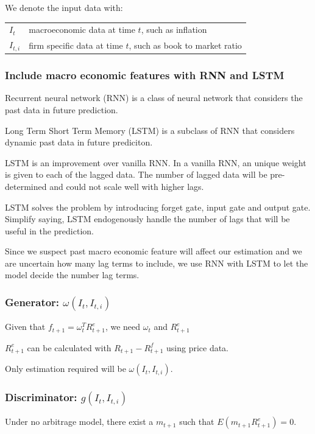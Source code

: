 \documentclass[11pt, oneside]{article}   	%
\begin{document}
We denote the input data with:

\begin{tabular}{l @{ := } l}
    $I_t$ & macroeconomic data at time $t$, such as inflation\\
    $I_{t, i}$ & firm specific data at time $t$, such as book to market ratio
\end{tabular}

\subsubsection{Include macro economic features with RNN and LSTM}

Recurrent neural network (RNN) is a class of neural network that considers the past data in future prediction.

Long Term Short Term Memory (LSTM) is a subclass of RNN that considers dynamic past data in future prediciton.

LSTM is an improvement over vanilla RNN.
In a vanilla RNN, an unique weight is given to each of the lagged data. 
The number of lagged data will be pre-determined and could not scale well with higher lags.

LSTM solves the problem by introducing forget gate, input gate and output gate.
Simplify saying, LSTM endogenously handle the number of lags that will be useful in the prediction.

Since we suspect past macro economic feature will affect our estimation and we are uncertain how many lag terms
to include, we use RNN with LSTM to let the model decide the number lag terms.

\subsubsection{Generator: $\omega(I_t, I_{t, i})$}

Given that $f_{t+1}=\omega_t^T R^e_{t+1}$, we need $\omega_t$ and $R^e_{t+1}$

$R^e_{t+1}$ can be calculated with $R_{t+1} - R^f_{t+1}$ using price data.

Only estimation required will be $\omega(I_t, I_{t, i})$.

\subsubsection{Discriminator: $g(I_t, I_{t, i})$}

Under no arbitrage model, there exist a $m_{t+1}$ such that $E(m_{t+1}R^e_{t+1})=0$.
\end{document}
